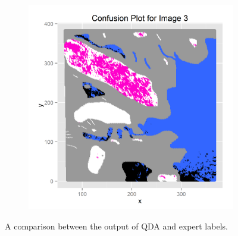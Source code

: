 \documentclass{article}\usepackage[]{graphicx}\usepackage[]{color}
\begin{document}
\begin{figure}[h]
\begin{subfigure}[b]{0.3\textwidth}
    \label{qda2_conf}
  \end{subfigure}  
  \begin{subfigure}[b]{0.3\textwidth}
    \includegraphics[width=\linewidth]{qda3_12fold_conf}
    \label{qda3_conf}
  \end{subfigure}  
  \caption{A comparison between the output of QDA and expert labels.}
  \label{fig:QDAconf}
\end{figure}
\end{document}
